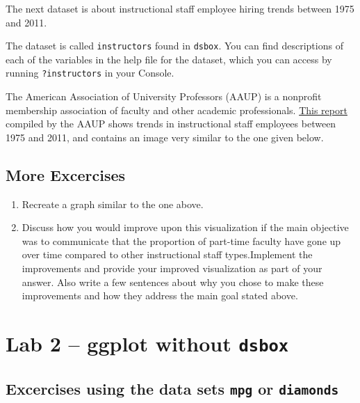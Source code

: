 \documentclass[
]{book}
\begin{document}
The next dataset is about instructional staff employee hiring trends between 1975 and 2011.

The dataset is called \texttt{instructors} found in \texttt{dsbox}. You can find descriptions of each of the variables in the help file for the dataset, which you can access by running \texttt{?instructors} in your Console.

The American Association of University Professors (AAUP) is a nonprofit membership association of faculty and other academic professionals. \href{https://www.aaup.org/sites/default/files/files/AAUP_Report_InstrStaff-75-11_apr2013.pdf}{This report} compiled by the AAUP shows trends in instructional staff employees between 1975 and 2011, and contains an image very similar to the one given below.

\hypertarget{more-excercises}{%
\section{More Excercises}\label{more-excercises}}

\begin{enumerate}
\def\labelenumi{\arabic{enumi}.}
\setcounter{enumi}{7}
\item
  Recreate a graph similar to the one above.
\item
  Discuss how you would improve upon this visualization if the main objective was to communicate that the proportion of part-time faculty have gone up over time compared to other instructional staff types.Implement the improvements and provide your improved visualization as part of your answer. Also write a few sentences about why you chose to make these improvements and how they address the main goal stated above.
\end{enumerate}

\hypertarget{lab-2-ggplot-without-dsbox}{%
\chapter{\texorpdfstring{Lab 2 -- ggplot without \texttt{dsbox}}{Lab 2 -- ggplot without dsbox}}\label{lab-2-ggplot-without-dsbox}}

\hypertarget{excercises-using-the-data-sets-mpg-or-diamonds}{%
\section{\texorpdfstring{Excercises using the data sets \texttt{mpg} or \texttt{diamonds}}{Excercises using the data sets mpg or diamonds}}\label{excercises-using-the-data-sets-mpg-or-diamonds}}
\end{document}
